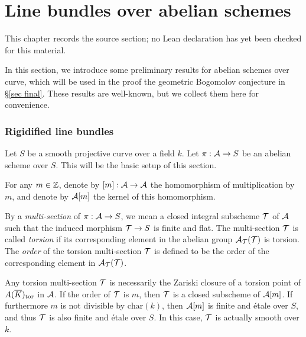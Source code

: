 \chapter{Line bundles over abelian schemes}
\label{geometric-bogomolov-conjecture-arbitrary-characteristics-chapter-04}

\begin{remark}
\label{geometric-bogomolov-conjecture-arbitrary-characteristics-chapter-04-source}
This chapter records the source section; no Lean declaration has yet been checked for this material.
\notready
\end{remark}

\label{sec line bundle}

In this section, we introduce some preliminary results for abelian schemes over curve, which will be used in the proof the geometric Bogomolov conjecture in \S\ref{sec final}. These results are well-known, but we collect them here for convenience.

\subsection{Rigidified line bundles}
Let $S$ be a smooth projective curve over a field $k$.
Let $\pi:{\mathcal A}\to S$ be an abelian scheme over $S$.
This will be the basic setup of this section.

For any $m\in{\mathbb Z}$, denote by $[m]:{\mathcal A}\to {\mathcal A}$ the homomorphism of multiplication by $m$, and denote by ${\mathcal A}[m]$ the kernel of this homomorphism.

By a \emph{multi-section} of $\pi:{\mathcal A}\to S$, we mean a closed integral subscheme ${\mathcal T}$ of ${\mathcal A}$ such that the induced morphism ${\mathcal T}\to S$ is finite and flat.
The multi-section ${\mathcal T}$ is called \emph{torsion} if its corresponding element in the abelian group ${\mathcal A}_{\mathcal T}({\mathcal T})$ is torsion.
The \emph{order} of the torsion multi-section ${\mathcal T}$ is defined to be the order of the corresponding element in ${\mathcal A}_{\mathcal T}({\mathcal T})$.

Any torsion multi-section ${\mathcal T}$ is necessarily the Zariski closure of a torsion point of $A({\overline{K}})_{\mathrm{tor}}$ in ${\mathcal A}$.
If the order of ${\mathcal T}$ is $m$, then ${\mathcal T}$ is a closed subscheme of ${\mathcal A}[m]$.
If furthermore $m$ is not divisible by $\mathrm{char}(k)$, then ${\mathcal A}[m]$ is finite and \'etale over $S$, and thus ${\mathcal T}$ is also finite and \'etale over $S$.
In this case, ${\mathcal T}$ is actually smooth over $k$.


